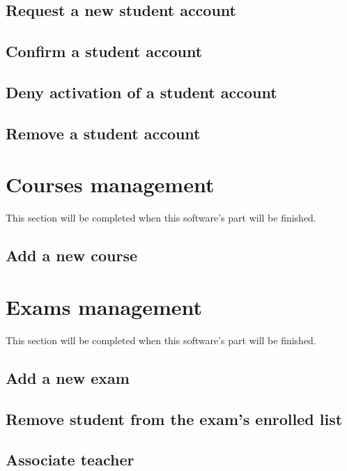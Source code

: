 \documentclass[ManualeUtente]{subfiles}
\begin{document}
\subsection{Request a new student account}
\subsection{Confirm a student account}
\subsection{Deny activation of a student account}
\subsection{Remove a student account}

\section{Courses management}
This section will be completed when this software's part will be finished.
\subsection{Add a new course}

\section{Exams management}
This section will be completed when this software's part will be finished.
\subsection{Add a new exam}
\subsection{Remove student from the exam's enrolled list}
\subsection{Associate teacher}
\end{document}
